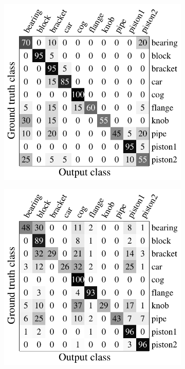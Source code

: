 \begin{figure}[ht]
	\centering
	\begin{subfigure}[t]{0.40\linewidth}
		\label{fig/reg/confusion_sap}
		\includegraphics[width=1\linewidth]{fig/reg/confusion_sap.pdf}
	\end{subfigure}
	\begin{subfigure}[t]{0.40\linewidth}
		\label{fig/reg/confusion_meanshift}
		\includegraphics[width=1\linewidth]{fig/reg/confusion_meanshift.pdf}

\end{subfigure}
\end{figure}
